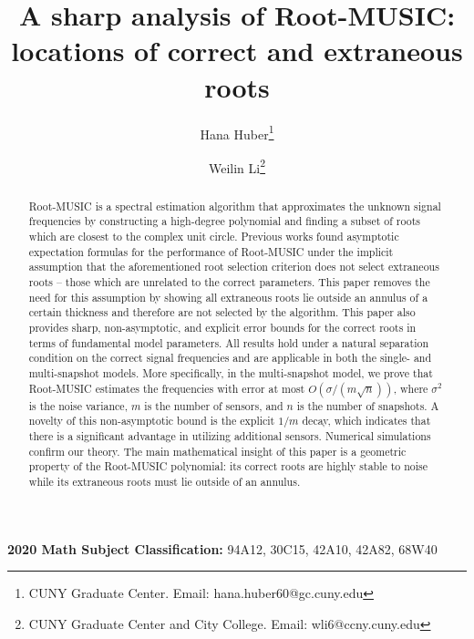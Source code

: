 \documentclass[11pt]{article}
\title{A sharp analysis of Root-MUSIC: \\ locations of correct and extraneous roots}
\author{Hana Huber\footnote{CUNY Graduate Center. Email: hana.huber60@gc.cuny.edu} \and Weilin Li\footnote{CUNY Graduate Center and City College. Email: wli6@ccny.cuny.edu}}
\theoremstyle{definition}
\numberwithin{theorem}{section}
\numberwithin{equation}{section}
\numberwithin{equation}{section}
\begin{document}
	
\maketitle 

\begin{abstract}

    Root-MUSIC is a spectral estimation algorithm that approximates the unknown signal frequencies by constructing a high-degree polynomial and finding a subset of roots which are closest to the complex unit circle. Previous works found asymptotic expectation formulas for the performance of Root-MUSIC under the implicit assumption that the aforementioned root selection criterion does not select extraneous roots -- those which are unrelated to the correct parameters. This paper removes the need for this assumption by showing all extraneous roots lie outside an annulus of a certain thickness and therefore are not selected by the algorithm. This paper also provides sharp, non-asymptotic, and explicit error bounds for the correct roots in terms of fundamental model parameters. All results hold under a natural separation condition on the correct signal frequencies and are applicable in both the single- and multi-snapshot models. More specifically, in the multi-snapshot model, we prove that Root-MUSIC estimates the frequencies with error at most $O(\sigma /(m \sqrt n))$, where $\sigma^2$ is the noise variance, $m$ is the number of sensors, and $n$ is the number of snapshots. A novelty of this non-asymptotic bound is the explicit $1/m$ decay, which indicates that there is a significant advantage in utilizing additional sensors. Numerical simulations confirm our theory. The main mathematical insight of this paper is a geometric property of the Root-MUSIC polynomial: its correct roots are highly stable to noise while its extraneous roots must lie outside of an annulus. 
    
\end{abstract}

\medskip
\noindent
{\bf 2020 Math Subject Classification:} 94A12, 30C15, 42A10, 42A82, 68W40

\end{document}
